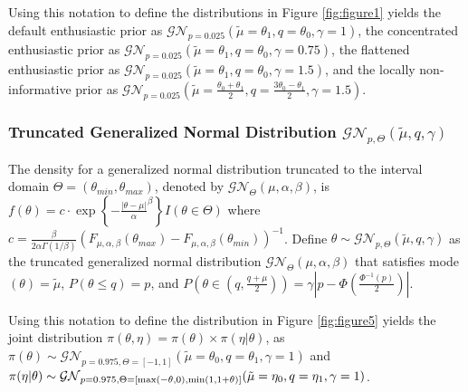 \documentclass[useAMS,usenatbib,referee]{biom}
\begin{document}
Using this notation to define the distributions in Figure \ref{fig:figure1} yields the default enthusiastic prior as $\mathcal{GN}_{p=0.025}(\tilde{\mu}=\theta_1,q=\theta_0,\gamma=1)$, the concentrated enthusiastic prior as $\mathcal{GN}_{p=0.025}(\tilde{\mu}=\theta_1,q=\theta_0,\gamma=0.75)$, the flattened enthusiastic prior as $\mathcal{GN}_{p=0.025}(\tilde{\mu}=\theta_1,q=\theta_0,\gamma=1.5)$, and the locally non-informative prior as $\mathcal{GN}_{p=0.025}(\tilde{\mu}=\frac{\theta_0+\theta_1}{2},q=\frac{3\theta_0-\theta_1}{2},\gamma=1.5)$.
\subsubsection{Truncated Generalized Normal Distribution $\mathcal{GN}_{p,\Theta}(\tilde{\mu},q,\gamma)$}\label{sec:gen_normal_appendix}
The density for a generalized normal distribution truncated to the interval domain $\Theta=(\theta_{min},\theta_{max})$, denoted by $\mathcal{GN}_\Theta(\mu,\alpha,\beta)$, is $f(\theta)=c\cdot\exp\left\{-\frac{|\theta-\mu|}{\alpha}^{\beta}\right\}{I(\theta\in \Theta)}$ where $c=\frac{\beta}{2\alpha \Gamma(1/\beta)}({F_{\mu,\alpha,\beta}(\theta_{max})-F_{\mu,\alpha,\beta}(\theta_{min})})^{-1}$. 
Define $\theta\sim\mathcal{GN}_{p,\Theta}(\tilde{\mu},q,\gamma)$ as the truncated generalized normal distribution $\mathcal{GN}_\Theta(\mu,\alpha,\beta)$ that satisfies mode$(\theta)=\tilde{\mu}$, $P(\theta\leq q)=p$, and $P(\theta\in(q,\frac{q+\mu}{2}))=\gamma|p-\Phi(\frac{\Phi^{-1}(p)}{2})|$.

Using this notation to define the distribution in Figure \ref{fig:figure5} yields the joint distribution $\pi(\theta,\eta)=\pi(\theta)\times\pi(\eta|\theta)$, as $
\pi(\theta)\sim\mathcal{GN}_{p=0.975,\Theta=[-1,1]}(\tilde{\mu}=\theta_0,q=\theta_1,\gamma=1)$ and $\pi(\eta|\theta)\sim \mathcal{GN}_{p=0.975,\Theta=[{\mathrm{max}}(-\theta,0),{\mathrm{min}}(1,1+\theta)]}(\tilde{\mu}=\eta_0,q=\eta_1,\gamma=1)$.

%
\end{document}
